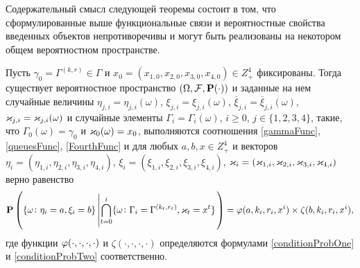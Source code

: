 \documentclass[a4paper,12pt,russian]{extarticle}
\newcommand{\G}{\Gamma}
\newcommand{\ga}[1]{\Gamma^{\left( #1 \right)} }
\renewcommand{\Pr}{{\mathbf P}}
\begin{document}
Содержательный смысл следующей теоремы состоит в том, что сформулированные выше функциональные связи и вероятностные свойства введенных объектов непротиворечивы и могут быть реализованы на некотором общем вероятностном пространстве.
\begin{theorem}
Пусть $\gamma_0=\ga{k,r} \in \G$ и $x_0=(x_{1,0},x_{2,0}, x_{3,0},x_{4,0})\in Z_+^4$ фиксированы.
Тогда существует вероятностное пространство $(\Omega, {\cal F}, \Pr(\cdot))$ и заданные на нем случайные величины $\eta_{j,i}=\eta_{j,i}(\omega)$, $\xi_{j,i}=\xi_{j,i}(\omega)$, $\overline{\xi}_{j,i}=\overline{\xi}_{j,i}(\omega)$,  $\varkappa_{j,i}=\varkappa_{j,i}(\omega)$ и случайные элементы $\G_i=\G_i(\omega)$, $i\geqslant 0$, $j\in \{1, 2, 3, 4\}$, такие, что $\G_0(\omega) = \gamma_0$ и $\varkappa_0(\omega)=x_0$, выполняются соотношения \eqref{gammaFunc}, \eqref{queuesFunc}, \eqref{FourthFunc} и для любых $a, b, x \in Z_+^4$ и векторов $\eta_i=(\eta_{1,i}, \eta_{2,i}, \eta_{3,i}, \eta_{4,i})$, $\xi_i=(\xi_{1,i}, \xi_{2,i}, \xi_{3,i}, \xi_{4,i})$, $\varkappa_i=(\varkappa_{1,i}, \varkappa_{2,i}, \varkappa_{3,i}, \varkappa_{4,i})$ верно равенство
\begin{equation*}
\Pr \left(\{ \omega \colon \eta_i = a, \xi_i=b\} \left|\bigcap_{t=0}^{i}\{\omega\colon \G_i=\ga{k_t,r_t}, \vk_t=x^t\}\right.\right)=
\vp(a,k_i,r_i,x^i)\times \zeta(b,k_i,r_i,x^i),
\end{equation*}
где функции $\varphi(\cdot, \cdot, \cdot, \cdot)$ и $\zeta(\cdot, \cdot, \cdot, \cdot)$ определяются формулами \eqref{conditionProbOne} и \eqref{conditionProbTwo} соответственно.

\label{myTheorem}
\end{theorem}
\end{document}
